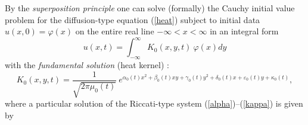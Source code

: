 \documentclass[12pt,reqno]{amsart}
\theoremstyle{plain}
\numberwithin{equation}{section}
\begin{document}
By the \textit{superposition principle} one can solve (formally) the Cauchy
initial value problem for the diffusion-type equation (\ref{heat}) subject
to initial data $u\left( x,0\right) =\varphi \left( x\right) $ on the entire
real line $-\infty <x<\infty $ in an integral form\begin{equation}
u\left( x,t\right) =\int_{-\infty }^{\infty }K_{0}\left( x,y,t\right) \
\varphi \left( x\right) dy  \label{CIVP}
\end{equation}with the \textit{fundamental solution} (heat kernel) \cite{SuazoSusVega10}:\begin{equation}
K_{0}\left( x,y,t\right) =\frac{1}{\sqrt{2\pi \mu _{0}\left( t\right) }}\
e^{\alpha _{0}\left( t\right) x^{2}+\beta _{0}\left( t\right) xy+\gamma
_{0}\left( t\right) y^{2}+\delta _{0}\left( t\right) x+\varepsilon
_{0}\left( t\right) y+\kappa _{0}\left( t\right) },  \label{heatkernel}
\end{equation}where a particular solution of the Riccati-type system (\ref{alpha})--(\ref{kappa}) is given by 
\end{document}
